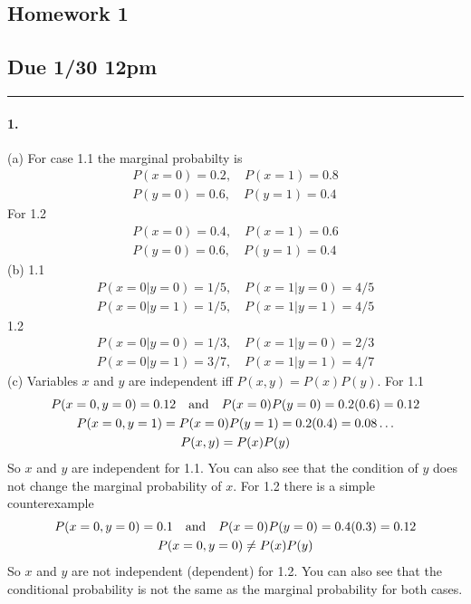 \documentclass[../main.tex]{subfiles}
\begin{document}
\newcommand{\E}{\mathrm{E}}
\newcommand{\Var}{\mathrm{Var}}

\setcounter{section}{1}
\begin{center}
    \section*{Homework 1}
    \subsection*{Due 1/30 12pm}
\end{center}
\hrule \vspace{10px}

\paragraph{1.}(a)
For case 1.1 the marginal probabilty is
\begin{align*}
    P(x = 0) = 0.2, \quad P(x = 1) = 0.8 \\
    P(y = 0) = 0.6, \quad P(y = 1) = 0.4
\end{align*}
For 1.2
\begin{align*}
    P(x = 0) = 0.4, \quad P(x = 1) = 0.6 \\
    P(y = 0) = 0.6, \quad P(y = 1) = 0.4
\end{align*}
(b) 1.1
\begin{align*}
    P(x=0 | y=0) = 1/5, \quad P(x=1 | y=0) = 4/5 \\
    P(x=0 | y=1) = 1/5, \quad P(x=1 | y=1) = 4/5
\end{align*}
1.2
\begin{align*}
    P(x=0 | y=0) = 1/3, \quad P(x=1 | y=0) = 2/3 \\
    P(x=0 | y=1) = 3/7, \quad P(x=1 | y=1) = 4/7
\end{align*}
(c) Variables $x$ and $y$ are independent iff $P(x,y) = P(x)P(y)$. For 1.1
\begin{gather*}
    P(x=0, y=0) = 0.12 \qand P(x=0) P(y=0) = 0.2(0.6) = 0.12 \\
    P(x=0, y=1) = P(x=0) P(y=1) = 0.2(0.4) = 0.08 \dots \\
    P(x,y) = P(x)P(y)
\end{gather*}
So $x$ and $y$ are independent for 1.1. You can also see that the condition of $y$ does not change
the marginal probability of $x$. For 1.2 there is a simple counterexample
\begin{gather*}
    P(x=0, y=0) = 0.1 \qand P(x=0) P(y=0) = 0.4(0.3) = 0.12 \\
    P(x=0, y=0) \neq P(x)P(y)
\end{gather*}
So $x$ and $y$ are not independent (dependent) for 1.2. You can also see that the conditional
probability is not the same as the marginal probability for both cases.
\end{document}
